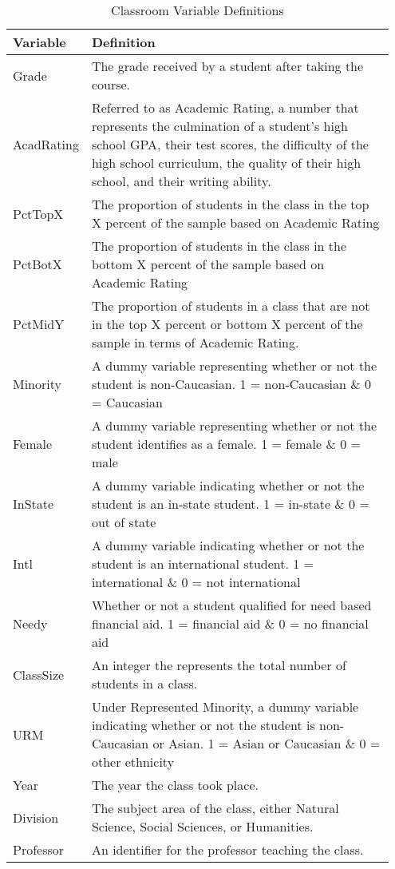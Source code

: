 \documentclass[12pt,a4paper,english,fleqn]{article}
\begin{document}
\begin{table}[htb]
\centering
\caption{Classroom Variable Definitions}\label{tab:def1}
 \begin{tabular}{|p{0.15\linewidth}|p{0.8\linewidth}|} 
 \hline\hline
 Variable & Definition \\ [0.5ex] 
 \hline\hline
 Grade & The grade received by a student after taking the course. \\ 
 \hline
 AcadRating & Referred to as Academic Rating, a number that represents the culmination of a student's high school GPA, their test scores, the difficulty of the high school curriculum, the quality of their high school, and their writing ability. \\
 \hline
 PctTopX & The proportion of students in the class in the top X percent of the sample based on Academic Rating \\
 \hline
 PctBotX & The proportion of students in the class in the bottom X percent of the sample based on Academic Rating \\
 \hline
 PctMidY & The proportion of students in a class that are not in the top X percent or bottom X percent of the sample in terms of Academic Rating. \\
 \hline
 Minority & A dummy variable representing whether or not the student is non-Caucasian. 1 = non-Caucasian \& 0 = Caucasian\\
 \hline
 Female & A dummy variable representing whether or not the student identifies as a female. 1 = female \& 0 = male\\
 \hline
 InState & A dummy variable indicating whether or not the student is an in-state student.  1 = in-state \& 0 = out of state\\
 \hline
 Intl & A dummy variable indicating whether or not the student is an international student.  1 = international \& 0 = not international\\
 \hline
 Needy & Whether or not a student qualified for need based financial aid.  1 = financial aid \& 0 = no financial aid\\
 \hline
 ClassSize & An integer the represents the total number of students in a class. \\
 \hline
 URM & Under Represented Minority, a dummy variable indicating whether or not the student is non-Caucasian or Asian.  1 = Asian or Caucasian \& 0 = other ethnicity \\
 \hline
 Year & The year the class took place. \\
 \hline
 Division & The subject area of the class, either Natural Science, Social Sciences, or Humanities. \\
 \hline
 Professor & An identifier for the professor teaching the class. \\
[1ex] 
 \hline\hline
\end{tabular}
\end{table}
\end{document}
